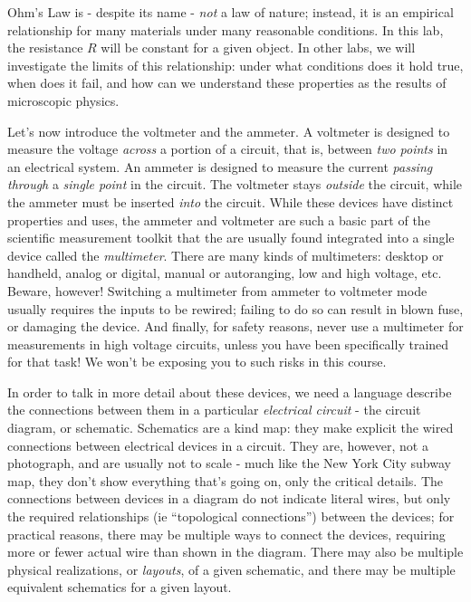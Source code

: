 \documentclass[12pt]{article}
\begin{document}
Ohm's Law is - despite its name - \textit{not} a law of nature;
instead, it is an empirical relationship for many materials under many
reasonable conditions.  In this lab, the resistance $R$ will be
constant for a given object.  In other labs, we will investigate the
limits of this relationship: under what conditions does it hold true,
when does it fail, and how can we understand these properties as the
results of microscopic physics.

Let's now introduce the voltmeter and the ammeter.  A voltmeter is
designed to measure the voltage \textit{across} a portion of a
circuit, that is, between \textit{two points} in an electrical system.
An ammeter is designed to measure the current \textit{passing through}
a \textit{single point} in the circuit.  The voltmeter stays
\textit{outside} the circuit, while the ammeter must be inserted
\textit{into} the circuit.  While these devices have distinct
properties and uses, the ammeter and voltmeter are such a basic part
of the scientific measurement toolkit that the are usually found
integrated into a single device called the \textit{multimeter}.  There
are many kinds of multimeters: desktop or handheld, analog or digital,
manual or autoranging, low and high voltage, etc.  Beware, however!
Switching a multimeter from ammeter to voltmeter mode usually requires
the inputs to be rewired; failing to do so can result in blown fuse,
or damaging the device.  And finally, for safety reasons, never use a
multimeter for measurements in high voltage circuits, unless you have
been specifically trained for that task!  We won't be exposing you to
such risks in this course.

In order to talk in more detail about these devices, we need a
language describe the connections between them in a particular
\textit{electrical circuit} - the circuit diagram, or schematic.
Schematics are a kind map: they make explicit the wired connections
between electrical devices in a circuit.  They are, however, not a
photograph, and are usually not to scale - much like the New York City
subway map, they don't show everything that's going on, only the
critical details.  The connections between devices in a diagram do not
indicate literal wires, but only the required relationships (ie
``topological connections'') between the devices; for practical
reasons, there may be multiple ways to connect the devices, requiring
more or fewer actual wire than shown in the diagram.  There may also
be multiple physical realizations, or \textit{layouts}, of a given
schematic, and there may be multiple equivalent schematics for a given
layout.
\end{document}
